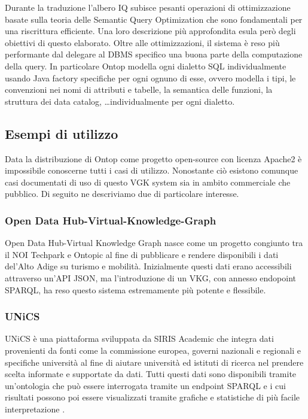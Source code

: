 Durante la traduzione l'albero IQ subisce pesanti operazioni di ottimizzazione basate sulla teoria delle Semantic Query Optimization che sono fondamentali per una riscrittura efficiente. Una loro descrizione più approfondita esula però degli obiettivi di questo elaborato.
Oltre alle ottimizzazioni, il sistema è reso più performante dal delegare al DBMS specifico una buona parte della computazione della query. In particolare Ontop modella ogni dialetto SQL individualmente usando Java factory specifiche per ogni ognuno di esse, ovvero 
modella i tipi, le convenzioni nei nomi di attributi e tabelle, la semantica delle funzioni, la struttura dei data catalog, \dots individualmente per ogni dialetto. 

\subsection{Esempi di utilizzo}
Data la distribuzione di Ontop come progetto open-source con licenza Apache2 è impossibile conoscerne tutti i casi di utilizzo. Nonostante ciò esistono comunque casi documentati di uso di questo VGK system sia in ambito commerciale che pubblico. Di seguito ne descriviamo due di particolare interesse. \cite{Ontop}
\subsubsection*{Open Data Hub-Virtual-Knowledge-Graph}
Open Data Hub-Virtual Knowledge Graph nasce come un progetto congiunto tra il NOI Techpark e Ontopic al fine di pubblicare e rendere disponibili i dati del'Alto Adige su turismo e mobilità. Inizialmente questi dati erano accessibili attraverso un'API JSON, ma l'introduzione di un VKG, con annesso endopoint SPARQL, ha
reso questo sistema estremamente più potente e flessibile.
\subsubsection*{UNiCS}
UNiCS è una piattaforma sviluppata da SIRIS Academic che integra dati provenienti da fonti come la commissione europea, governi nazionali e regionali e specifiche università al fine di aiutare università ed istituti di ricerca nel prendere scelta informate e supportate da dati. Tutti questi dati sono disponibili 
tramite un'ontologia che può essere interrogata tramite un endpoint SPARQL e i cui risultati possono poi essere visualizzati tramite grafiche e statistiche di più facile interpretazione \cite{UniCS}.

